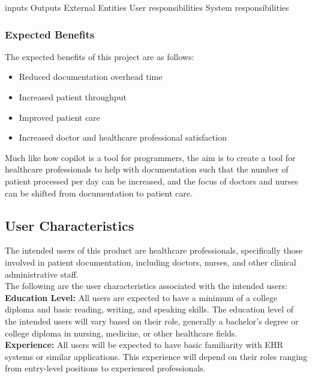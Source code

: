 \documentclass[12pt]{article}
\begin{document}
inputs
Outputs
External Entities
User responsibilities
System responsibilities

\subsubsection{Expected Benefits} \label{sec_ExpectedBenefits}

The expected benefits of this project are as follows:
\begin{itemize}
  \item Reduced documentation overhead time
  \item Increased patient throughput
  \item Improved patient care
  \item Increased doctor and healthcare professional satisfaction
\end{itemize}

Much like how copilot is a tool for programmers, the aim is to create a tool for healthcare professionals to help with documentation such that the number of patient processed per day can be increased, and the focus of doctors and nurses can be shifted from documentation to patient care. 


\subsection{User Characteristics} \label{sec_UserCharacteristics}

The intended users of this product are healthcare professionals, specifically those involved in patient documentation, including doctors, nurses, and other clinical administrative staff. \\

The following are the user characteristics associated with the intended users:\\

\textbf{Education Level:} All users are expected to have a minimum of a college diploma and basic reading, writing, and speaking skills. The education level of the intended users will vary based on their role, generally a bachelor’s degree or college diploma in nursing, medicine, or other healthcare fields. \\

\textbf{Experience:} All users will be expected to have basic familiarity with EHR systems or similar applications. This experience will depend on their roles ranging from entry-level positions to experienced professionals. \\
\end{document}
